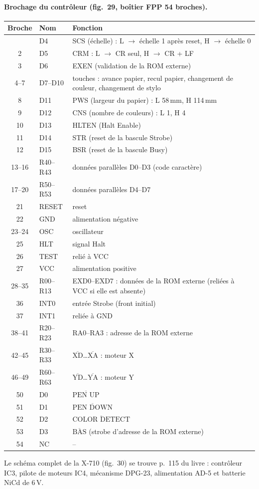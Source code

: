 \documentclass[a4paper,10pt]{article}
\begin{document}
\paragraph{Brochage du contrôleur (fig.~29, boîtier FPP 54 broches).}
{\small
\begin{longtable}{@{}cl>{\raggedright\arraybackslash}p{11cm}@{}}
\toprule
Broche & Nom & Fonction \\
\midrule\endhead
\bottomrule\endfoot
1 & D4 & SCS (échelle) : L $\to$ échelle 1 après reset, H $\to$ échelle 0 \\
2 & D5 & CRM : L $\to$ CR seul, H $\to$ CR + LF \\
3 & D6 & EXEN (validation de la ROM externe) \\
4--7 & D7--D10 & touches : avance papier, recul papier, changement de couleur, changement de stylo \\
8 & D11 & PWS (largeur du papier) : L 58\,mm, H 114\,mm \\
9 & D12 & CNS (nombre de couleurs) : L 1, H 4 \\
10 & D13 & HLTEN (Halt Enable) \\
11 & D14 & STR (reset de la bascule Strobe) \\
12 & D15 & BSR (reset de la bascule Busy) \\
13--16 & R40--R43 & données parallèles D0--D3 (code caractère) \\
17--20 & R50--R53 & données parallèles D4--D7 \\
21 & RESET & reset \\
22 & GND & alimentation négative \\
23--24 & OSC & oscillateur \\
25 & HLT & signal Halt \\
26 & TEST & relié à VCC \\
27 & VCC & alimentation positive \\
28--35 & R00--R13 & EXD0--EXD7 : données de la ROM externe (reliées à VCC si elle est absente) \\
36 & INT0 & entrée Strobe (front initial) \\
37 & INT1 & reliée à GND \\
38--41 & R20--R23 & RA0--RA3 : adresse de la ROM externe \\
42--45 & R30--R33 & $\overline{\mbox{XD}}$\dots$\overline{\mbox{XA}}$ : moteur X \\
46--49 & R60--R63 & $\overline{\mbox{YD}}$\dots$\overline{\mbox{YA}}$ : moteur Y \\
50 & D0 & $\overline{\mbox{PEN UP}}$ \\
51 & D1 & $\overline{\mbox{PEN DOWN}}$ \\
52 & D2 & $\overline{\mbox{COLOR DETECT}}$ \\
53 & D3 & $\overline{\mbox{BAS}}$ (strobe d'adresse de la ROM externe) \\
54 & NC & -- \\
\end{longtable}
}
Le schéma complet de la X-710 (fig.~30) se trouve p.~115 du livre :
contrôleur IC3, pilote de moteurs IC4, mécanisme DPG-23, alimentation
AD-5 et batterie NiCd de 6\,V.
\end{document}
